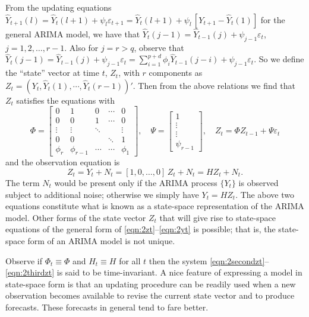From the updating equations $\hat{Y}_{t+1}(l) = \hat{Y}_t(l+1) + \psi_l\varepsilon_{t+1}= \hat{Y}_t(l + 1) + \psi_l\, [Y_{t+1} - \hat{Y}_t(1)]$ for the general ARIMA model, we have that $\hat{Y}_t(j - 1)= \hat{Y}_{t-1}(j) + \psi_{j-1}\varepsilon_t$, $j = 1,2,\ldots,r-1$. Also for $j= r>q$, observe that $\hat{Y}_t(j-1)= \hat{Y}_{t-1}(j) + \psi_{j-1}\varepsilon_t = \sum_{i=1}^{p+d}\phi_i\hat{Y}_{t-1}(j - i) + \psi_{j-1}\varepsilon_t$. So we define the ``state'' vector at time $t$, $Z_t$, with $r$ components as $Z_t = (Y_t, \hat{Y}_t(1),\cdots,\hat{Y}_t(r-1))'$. Then from the above relations we find that $Z_t$ satisfies the equations with
	\begin{equation} \label{eqn:2secondzt}
	\Phi= \begin{bmatrix}
                        0 & 1 & 0 & \cdots & 0 \\
                        0 & 0 & 1 & \cdots &  0 \\
                        \vdots & \vdots &\ddots  &  &  \vdots \\
                        0 & 0 &  & \ddots &  1 \\
                        \phi_r & \phi_{r-1} & \cdots & \cdots &  \phi_1
                    \end{bmatrix}, \quad
                   \Psi= 
                    \begin{bmatrix}
                    1\\ \vdots \\ \vdots \\ \psi_{r-1}
                    \end{bmatrix}, \quad
	Z_t= \Phi Z_{t-1} + \Psi\varepsilon_t
	\end{equation}
and the observation equation is
	\begin{equation}\label{eqn:2thirdzt}
	Z_t = Y_t + N_t = [1,0,\ldots,0] \,Z_t + N_t = H Z_t + N_t.
	\end{equation}
The term $N_t$ would be present only if the ARIMA process $\{Y_t\}$ is observed subject to additional noise; otherwise we simply have $Y_t = HZ_t$. The above two equations constitute what is known as a state-space representation of the ARIMA model. Other forms of the state vector $Z_t$ that will give rise to state-space equations of the general form of \eqref{eqn:2zt}--\eqref{eqn:2yt} is possible; that is, the state-space form of an ARIMA model is not unique.


Observe if $\Phi_t \equiv \Phi$ and $H_t \equiv H$ for all $t$ then the system \eqref{eqn:2secondzt}--\eqref{eqn:2thirdzt} is said to be time-invariant. A nice feature of expressing a model in state-space form is that an updating procedure can be readily used when a new observation becomes available to revise the current state vector and to produce forecasts. These forecasts in general tend to fare better. 



